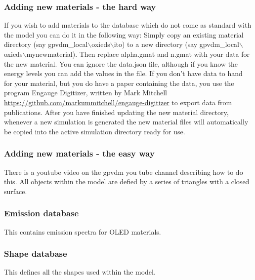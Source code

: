 \subsubsection{Adding new materials - the hard way}
If you wish to add materials to the database which do not come as standard with the model you can do it in the following way:  Simply copy an existing material directory (say gpvdm\_local$\backslash$oxieds$\backslash$ito) to a new directory (say gpvdm\_local$\backslash$oxieds$\backslash$mynewmaterial).  Then replace alpha.gmat and n.gmat with your data for the new material. You can ignore the data.json file, although if you know the energy levels you can add the values in the file.
\newline
\newline
If you don't have data to hand for your material, but you do have a paper containing the data, you use the program Engauge Digitizer, written by  Mark Mitchell \url{https://github.com/markummitchell/engauge-digitizer} to export data from publications.  After you have finished updating the new material directory, whenever a new simulation is generated the new material files will automatically be copied into the active simulation directory ready for use. 

\subsubsection{Adding new materials - the easy way}
There is a youtube video on the gpvdm you tube channel describing how to do this. All objects within the model are defied by a series of triangles with a closed surface.

\subsubsection{Emission database}
This contains emission spectra for OLED materials.

\subsubsection{Shape database}
\label{sec:shapedatabase}
This defines all the shapes used within the model.

